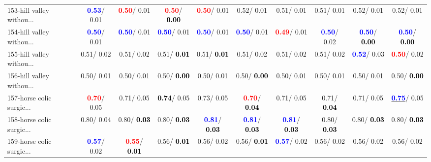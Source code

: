 \begin{table}[h]
\begin{center}
{\begin{tabular}{lc|c|c|c|c|c|c|c|c}
153-hill valley withou... & \textcolor{blue}{\textbf{  0.53}}/  0.01 & \textcolor{red}{\textbf{  0.50}}/  0.01 & \textcolor{red}{\textbf{  0.50}}/\textcolor{black}{\textbf{  0.00}} & \textcolor{red}{\textbf{  0.50}}/  0.01 &   0.52/  0.01 &   0.51/  0.01 &   0.51/  0.01 &   0.52/  0.01 &   0.52/  0.01 \\
154-hill valley withou... & \textcolor{blue}{\textbf{  0.50}}/  0.01 & \textcolor{blue}{\textbf{  0.50}}/  0.01 & \textcolor{blue}{\textbf{  0.50}}/  0.01 & \textcolor{blue}{\textbf{  0.50}}/  0.01 & \textcolor{blue}{\textbf{  0.50}}/  0.01 & \textcolor{red}{\textbf{  0.49}}/  0.01 & \textcolor{blue}{\textbf{  0.50}}/  0.02 & \textcolor{blue}{\textbf{  0.50}}/\textcolor{black}{\textbf{  0.00}} & \textcolor{blue}{\textbf{  0.50}}/\textcolor{black}{\textbf{  0.00}} \\
155-hill valley withou... &   0.51/  0.02 &   0.51/  0.02 &   0.51/\textcolor{black}{\textbf{  0.01}} &   0.51/\textcolor{black}{\textbf{  0.01}} &   0.51/  0.02 &   0.51/  0.02 &   0.51/  0.02 & \textcolor{blue}{\textbf{  0.52}}/  0.03 & \textcolor{red}{\textbf{  0.50}}/  0.02 \\
156-hill valley withou... &   0.50/  0.01 &   0.50/  0.01 &   0.50/\textcolor{black}{\textbf{  0.00}} &   0.50/  0.01 &   0.50/\textcolor{black}{\textbf{  0.00}} &   0.50/  0.01 &   0.50/  0.01 &   0.50/  0.01 &   0.50/\textcolor{black}{\textbf{  0.00}} \\ \hline
157-horse colic surgic... & \textcolor{red}{\textbf{  0.70}}/  0.05 &   0.71/  0.05 & \textcolor{black}{\textbf{  0.74}}/  0.05 &   0.73/  0.05 & \textcolor{red}{\textbf{  0.70}}/\textcolor{black}{\textbf{  0.04}} &   0.71/  0.05 &   0.71/\textcolor{black}{\textbf{  0.04}} &   0.71/  0.05 & \underline{\textcolor{blue}{\textbf{  0.75}}}/  0.05 \\
158-horse colic surgic... &   0.80/  0.04 &   0.80/\textcolor{black}{\textbf{  0.03}} &   0.80/\textcolor{black}{\textbf{  0.03}} & \textcolor{blue}{\textbf{  0.81}}/\textcolor{black}{\textbf{  0.03}} & \textcolor{blue}{\textbf{  0.81}}/\textcolor{black}{\textbf{  0.03}} & \textcolor{blue}{\textbf{  0.81}}/\textcolor{black}{\textbf{  0.03}} &   0.80/\textcolor{black}{\textbf{  0.03}} &   0.80/\textcolor{black}{\textbf{  0.03}} &   0.80/\textcolor{black}{\textbf{  0.03}} \\
159-horse colic surgic... & \textcolor{blue}{\textbf{  0.57}}/  0.02 & \textcolor{red}{\textbf{  0.55}}/\textcolor{black}{\textbf{  0.01}} &   0.56/\textcolor{black}{\textbf{  0.01}} &   0.56/  0.02 &   0.56/\textcolor{black}{\textbf{  0.01}} & \textcolor{blue}{\textbf{  0.57}}/  0.02 &   0.56/  0.02 &   0.56/  0.02 &   0.56/  0.02 \\

\end{tabular}}
\end{center}
\end{table}
